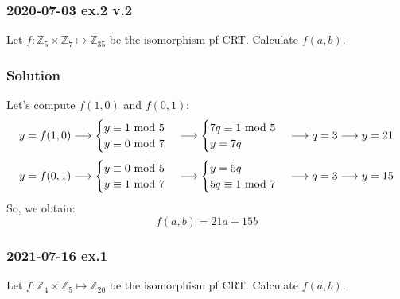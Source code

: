 \subsubsection{2020-07-03 ex.2 v.2}
Let $f:\mathbb{Z}_5\times\mathbb{Z}_7\mapsto\mathbb{Z}_{35}$ be the isomorphism pf CRT. Calculate $f(a,b)$.
\subsubsection*{Solution}
Let's compute $f(1,0)$ and $f(0,1)$:
\begin{equation*}
    y=f(1,0)\longrightarrow
    \begin{cases}
        y\equiv1\text{ mod }5\\
        y\equiv0\text{ mod }7
    \end{cases}
    \longrightarrow
    \begin{cases}
        7q\equiv1\text{ mod }5\\
        y=7q
    \end{cases}
    \longrightarrow q=3\longrightarrow y=21
\end{equation*}
\begin{equation*}
    y=f(0,1)\longrightarrow
    \begin{cases}
        y\equiv0\text{ mod }5\\
        y\equiv1\text{ mod }7
    \end{cases}
    \longrightarrow
    \begin{cases}
        y=5q\\
        5q\equiv1\text{ mod }7
    \end{cases}
    \longrightarrow q=3\longrightarrow y=15
\end{equation*}
So, we obtain:
$$f(a,b)=21a+15b$$

\subsubsection{2021-07-16 ex.1}
Let $f:\mathbb{Z}_4\times\mathbb{Z}_5\mapsto\mathbb{Z}_{20}$ be the isomorphism pf CRT. Calculate $f(a,b)$.
